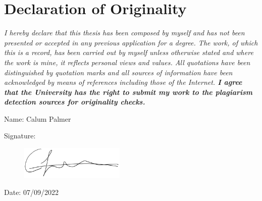 

\chapter*{Declaration of Originality}\label{ch:declaration of originality}

\emph{I hereby declare that this thesis has been composed by myself and has not been
    presented or accepted in any previous application for a degree. The work, of which
    this is a record, has been carried out by myself unless otherwise stated and where
    the work is mine, it reflects personal views and values. All quotations have been
    distinguished by quotation marks and all sources of information have been
    acknowledged by means of references including those of the Internet.
    \textbf{I agree that the University has the right to submit my work to the plagiarism
    detection sources for originality checks.}}

\vspace{2cm}
        {\noindent\large Name: Calum Palmer}

\vspace{0.5cm}
{\noindent\large Signature: }
\begin{figure}[h]
    \includegraphics[width=5cm]{figures/Signature}
\end{figure}

\vspace{0.5cm}
{\noindent\large Date: 07/09/2022}

\newpage